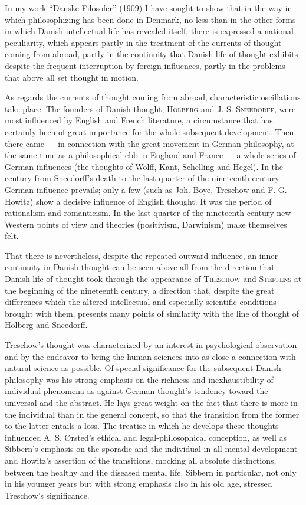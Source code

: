 \documentclass[12pt,a4paper,openany]{book}
\newcommand{\opage}[1]{\marginnote{\footnotesize\textit{[#1]}}}
\newenvironment{intro}{\par}{\par}
\begin{document}
\begin{intro}

In my work ``Danske Filosofer'' (1909) I have sought to show that in the way in
which philosophizing has been done in Denmark, no less than in the other forms
in which Danish intellectual life has revealed itself, there is expressed a
national peculiarity, which appears partly in the treatment of the currents of
thought coming from abroad, partly in the continuity that Danish life of
thought exhibits despite the frequent interruption by foreign influences,
partly in the problems that above all set thought in motion.

As regards the currents of thought coming from abroad, characteristic
oscillations take place. The founders of Danish thought,
\textsc{Holberg} and J. S. \textsc{Sneedorff}, were most influenced by English
and French literature, a circumstance that has certainly been of great
importance for the whole subsequent development. Then there came
--- in connection with the great movement in German philosophy, at the same
time as a philosophical ebb in England and France --- a whole series of German
influences (the thoughts of Wolff, Kant, Schelling and Hegel). In the century
from Sneedorff's death to the last quarter of the nineteenth century German
influence prevails; only a few (such as Joh. Boye, Treschow and F. G. Howitz)
show a decisive influence of English thought. It was the period of rationalism
and romanticism. In the last quarter of the nineteenth century new Western
points of view and theories (positivism, Darwinism) make themselves felt.

That there is nevertheless, despite the repeated outward influence, an inner
continuity in Danish thought can be seen above all from the direction that
Danish life of thought took through the appearance of \textsc{Treschow} and
\textsc{Steffens} at the beginning of the nineteenth century, a direction that,
despite the great differences which the altered intellectual and especially
scientific conditions brought with them, presents many points of similarity
with the line of thought of Holberg and Sneedorff.

Treschow's thought was characterized by an interest in psychological
observation and by the endeavor to bring the human sciences into as close a
connection with natural science as possible. Of special significance for the
subsequent Danish philosophy was
\setcounter{footnote}{0}%
\opage{2}his strong emphasis on the richness and inexhaustibility of individual
phenomena as against German thought's tendency toward the universal and the
abstract. He lays great weight on the fact that there is more in the individual
than in the general concept, so that the transition from the former to the
latter entails a loss. The treatise in which he develops these thoughts
influenced A. S. Ørsted's ethical and legal-philosophical conception, as well as
Sibbern's emphasis on the sporadic and the individual in all mental development
and Howitz's assertion of the transitions, mocking all absolute distinctions,
between the healthy and the diseased mental life. Sibbern in particular, not
only in his younger years but with strong emphasis also in his old age,
stressed Treschow's significance.


\end{intro}
\end{document}
